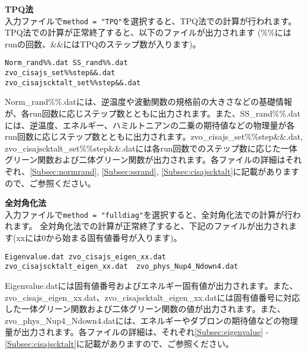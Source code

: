 \begin{description}
\item {\bf TPQ法}\\
  入力ファイルで\verb|method = "TPQ"|を選択すると、TPQ法での計算が行われます。
  TPQ法での計算が正常終了すると、以下のファイルが出力されます
  (\%\%にはrunの回数、\&\&にはTPQのステップ数が入ります)。\\
\begin{minipage}{14cm}
\begin{screen}
\begin{verbatim}
Norm_rand%%.dat SS_rand%%.dat
zvo_cisajs_set%%step&&.dat  
zvo_cisajscktalt_set%%step&&.dat  
\end{verbatim}
\end{screen}
\end{minipage}
Norm\_rand\%\%.datには、逆温度や波動関数の規格前の大きさなどの基礎情報が、各run回数に応じステップ数とともに出力されます。また、SS\_rand\%\%.datには、逆温度、エネルギー、ハミルトニアンの二乗の期待値などの物理量が各run回数に応じステップ数とともに出力されます。zvo\_cisajs\_set\%\%step\&\&.dat, zvo\_cisajscktalt\_set\%\%step\&\&.datには各run回数でのステップ数に応じた一体グリーン関数および二体グリーン関数が出力されます。各ファイルの詳細はそれぞれ、\ref{Subsec:normrand}, \ref{Subsec:ssrand}, \ref{Subsec:cisajscktalt}に記載がありますので、ご参照ください。

\item {\bf 全対角化法}\\
入力ファイルで\verb|method = "fulldiag"|を選択すると、全対角化法での計算が行われます。
全対角化法での計算が正常終了すると、下記のファイルが出力されます(xxには0から始まる固有値番号が入ります)。\\
\begin{minipage}{14cm}
\begin{screen}
\begin{verbatim}
Eigenvalue.dat zvo_cisajs_eigen_xx.dat
zvo_cisajscktalt_eigen_xx.dat  zvo_phys_Nup4_Ndown4.dat
\end{verbatim}
\end{screen}
\end{minipage}

Eigenvalue.datには固有値番号およびエネルギー固有値が出力されます。また、zvo\_cisajs\_eigen\_xx.dat、zvo\_cisajscktalt\_eigen\_xx.datには固有値番号に対応した一体グリーン関数および二体グリーン関数の値が出力されます。また、zvo\_phys\_Nup4\_Ndown4.datには、エネルギーやダブロンの期待値などの物理量が出力されます。各ファイルの詳細は、それぞれ\ref{Subsec:eigenvalue} - \ref{Subsec:cisajscktalt}に記載がありますので、ご参照ください。

\end{description}

